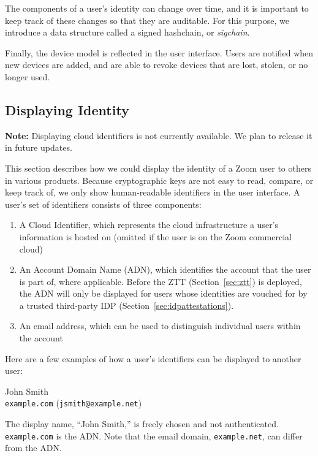 The components of a user's identity can change over time, and it is important to keep track of these
changes so that they are auditable. For this purpose, we introduce a data structure called a signed
hashchain, or \textit{sigchain}.

Finally, the device model is reflected in the user interface. Users are notified when new devices
are added, and are able to revoke devices that are lost, stolen, or no longer used.

\subsection{Displaying Identity}
\label{subsec:displayid}

\textbf{Note:} Displaying cloud identifiers is not currently available. We plan to release it in
future updates.

This section describes how we could display the identity of a Zoom user to others in various
products. Because cryptographic keys are not easy to read, compare, or keep track of, we only show
human-readable identifiers in the user interface. A user's set of identifiers consists of three
components:

\begin{enumerate}
\item A Cloud Identifier, which represents the cloud infrastructure a user's information is hosted
on (omitted if the user is on the Zoom commercial cloud)
\item An Account Domain Name (ADN), which identifies the account that the user is part of, where
applicable. Before the ZTT (Section~\ref{sec:ztt}) is deployed, the ADN will only be displayed for
users whose identities are vouched for by a trusted third-party IDP
(Section~\ref{sec:idpattestations}).
\item
    An email address, which can be used to distinguish individual users within the account
\end{enumerate}

Here are a few examples of how a user's identifiers can be displayed to another user:

\begin{multicols}{2}
John Smith \\
\texttt{example.com} (\texttt{jsmith@example.net})

\columnbreak

The display name, ``John Smith,'' is freely chosen and not authenticated. \texttt{example.com} is the
ADN\@. Note that the email domain, \texttt{example.net}, can differ from the ADN\@.
\end{multicols}

